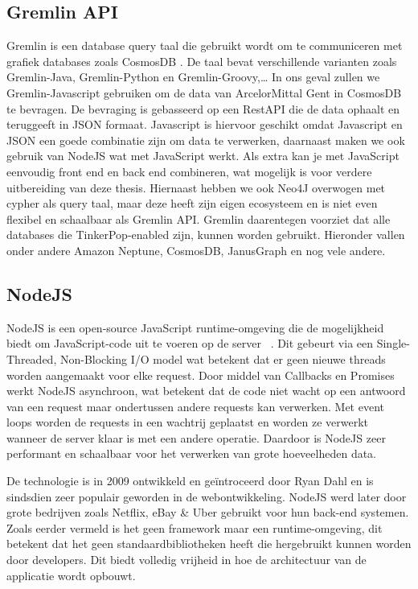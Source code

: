 \subsection{Gremlin API}
Gremlin is een database query taal die gebruikt wordt om te communiceren met grafiek databases zoals CosmosDB \autocite{Tinkerpop2023}.\@
De taal bevat verschillende varianten zoals Gremlin-Java, Gremlin-Python en Gremlin-Groovy,\dots
In ons geval zullen we Gremlin-Javascript gebruiken om de data van ArcelorMittal Gent in CosmosDB te bevragen. De bevraging is gebasseerd op een RestAPI die de data ophaalt en teruggeeft in JSON formaat.
Javascript is hiervoor geschikt omdat Javascript en JSON een goede combinatie zijn om data te verwerken, daarnaast maken we ook gebruik van NodeJS wat met JavaScript werkt. 
Als extra kan je met JavaScript eenvoudig front end en back end combineren, wat mogelijk is voor verdere uitbereiding van deze thesis.
Hiernaast hebben we ook Neo4J overwogen met cypher als query taal, maar deze heeft zijn eigen ecosysteem en is niet even flexibel en schaalbaar als Gremlin API.\@
Gremlin daarentegen voorziet dat alle databases die TinkerPop-enabled zijn, kunnen worden gebruikt. Hieronder vallen onder andere Amazon Neptune, CosmosDB, JanusGraph en nog vele andere.\autocite{Tinkerpop2023a}

\subsection{NodeJS}
NodeJS is een open-source JavaScript runtime-omgeving die de mogelijkheid biedt om JavaScript-code uit te voeren op de server ~\autocite{NodeJS2022}.
Dit gebeurt via een Single-Threaded, Non-Blocking I/O model wat betekent dat er geen nieuwe threads worden aangemaakt voor elke request.
Door middel van Callbacks en Promises werkt NodeJS asynchroon, wat betekent dat de code niet wacht op een antwoord van een request maar ondertussen andere requests kan verwerken.
Met event loops worden de requests in een wachtrij geplaatst en worden ze verwerkt wanneer de server klaar is met een andere operatie.
Daardoor is NodeJS zeer performant en schaalbaar voor het verwerken van grote hoeveelheden data.

De technologie is in 2009 ontwikkeld en geïntroceerd door Ryan Dahl en is sindsdien zeer populair geworden in de webontwikkeling. 
NodeJS werd later door grote bedrijven zoals Netflix, eBay \& Uber gebruikt voor hun back-end systemen.
Zoals eerder vermeld is het geen framework maar een runtime-omgeving, dit betekent dat het geen standaardbibliotheken heeft die hergebruikt kunnen worden door developers.
Dit biedt volledig vrijheid in hoe de architectuur van de applicatie wordt opbouwt.

